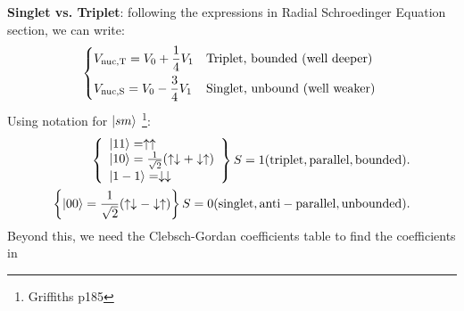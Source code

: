 \documentclass{school-22.101-notes}
\begin{document}
\textbf{Singlet vs. Triplet}: following the expressions in Radial Schroedinger Equation section, we can write: 
\begin{align}
\begin{dcases*}
V_{\mathrm{nuc,T}} = V_0 + \frac{1}{4} V_1 & Triplet, bounded (well deeper) \\
V_{\mathrm{nuc,S}} = V_0 - \frac{3}{4} V_1 & Singlet, unbound (well weaker)
\end{dcases*}
\end{align}
Using notation for $\left| s m \right>$ \footnote{Griffiths p185}: 
\begin{align}
\left\{ \begin{array}{l} 
\left| 1 1 \right> = \uparrow \uparrow \\
\left| 1 0 \right> = \frac{1}{\sqrt{2}} (\uparrow \downarrow + \downarrow \uparrow ) \\
\left| 1 -1 \right> = \downarrow \downarrow
\end{array} \right\}
S = 1 (\mathrm{triplet, parallel, bounded}). \\
\left\{ \left| 0 0 \right> = \frac{1}{\sqrt{2}} (\uparrow \downarrow - \downarrow \uparrow ) \right\} 
S = 0 (\mathrm{singlet, anti-parallel, unbounded}).
\end{align}
Beyond this, we need the Clebsch-Gordan coefficients table to find the coefficients in 
\end{document}
